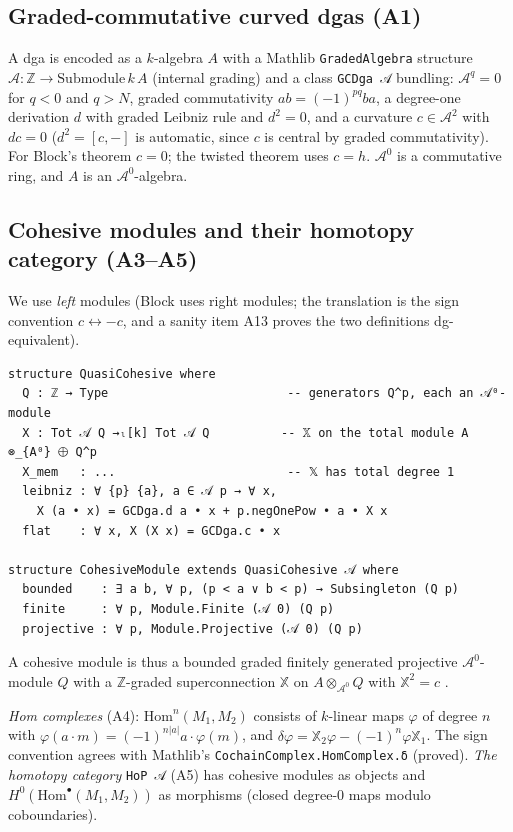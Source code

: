 \subsection{Graded-commutative curved dgas (A1)}
A dga is encoded as a $k$-algebra $A$ with a Mathlib \texttt{GradedAlgebra} structure
$\mathcal A\colon\mathbb Z\to\mathrm{Submodule}\,k\,A$ (internal grading) and a class
\texttt{GCDga 𝒜} bundling: ${\mathcal{A}}^q=0$ for $q<0$ and $q>N$, graded commutativity
$ab=(-1)^{pq}ba$, a degree-one derivation $d$ with graded Leibniz rule and $d^2=0$, and a
curvature $c\in{\mathcal{A}}^2$ with $dc=0$ ($d^2=[c,-]$ is automatic, since $c$ is central by graded
commutativity). For Block's theorem $c=0$;
the twisted theorem uses $c=h$. ${\mathcal{A}}^0$ is a commutative ring, and $A$ is an ${\mathcal{A}}^0$-algebra.

\subsection{Cohesive modules and their homotopy category (A3--A5)}
We use \emph{left} modules (Block uses right modules; the translation is the sign convention
$c\leftrightarrow -c$, and a sanity item A13 proves the two definitions dg-equivalent).
\begin{verbatim}
structure QuasiCohesive where
  Q : ℤ → Type                         -- generators Q^p, each an 𝒜⁰-module
  X : Tot 𝒜 Q →ₗ[k] Tot 𝒜 Q          -- 𝕏 on the total module A ⊗_{A⁰} ⨁ Q^p
  X_mem   : ...                        -- 𝕏 has total degree 1
  leibniz : ∀ {p} {a}, a ∈ 𝒜 p → ∀ x,
    X (a • x) = GCDga.d a • x + p.negOnePow • a • X x
  flat    : ∀ x, X (X x) = GCDga.c • x

structure CohesiveModule extends QuasiCohesive 𝒜 where
  bounded    : ∃ a b, ∀ p, (p < a ∨ b < p) → Subsingleton (Q p)
  finite     : ∀ p, Module.Finite (𝒜 0) (Q p)
  projective : ∀ p, Module.Projective (𝒜 0) (Q p)
\end{verbatim}
A cohesive module is thus a bounded graded finitely generated projective ${\mathcal{A}}^0$-module $Q$ with a
$\mathbb Z$-graded superconnection ${\mathbb{X}}$ on $A\otimes_{{\mathcal{A}}^0}Q$ with ${\mathbb{X}}^2=c$ \cite[Def~2.3.2]{B}.

\emph{Hom complexes} (A4): ${\mathrm{Hom}}^n(M_1,M_2)$ consists of $k$-linear maps $\varphi$ of degree $n$
with $\varphi(a\cdot m)=(-1)^{n|a|}a\cdot\varphi(m)$, and
$\delta\varphi={\mathbb{X}}_2\varphi-(-1)^n\varphi{\mathbb{X}}_1$. The sign convention agrees with Mathlib's
\texttt{CochainComplex.HomComplex.δ} (proved). \emph{The homotopy category} \texttt{HoP 𝒜} (A5)
has cohesive modules as objects and $H^0({\mathrm{Hom}}^\bullet(M_1,M_2))$ as morphisms (closed degree-0
maps modulo coboundaries).

